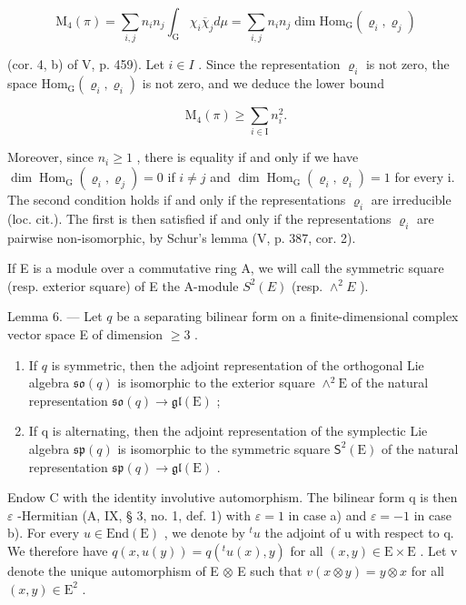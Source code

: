 \[
\mathrm{M} _ {4} (\pi) = \sum_ {i, j} n _ {i} n _ {j} \int_ {\mathrm{G}} \chi_ {i} \overline {{\chi}} _ {j} d \mu = \sum_ {i, j} n _ {i} n _ {j} \dim \mathrm{Hom} _ {\mathrm{G}} (\varrho_ {i}, \varrho_ {j})
\]

(cor. 4, b) of V, p. 459). Let \(i \in I\) . Since the representation \(\varrho_{i}\) is not zero, the space \(\mathrm{Hom}_{\mathrm{G}}(\varrho_{i}, \varrho_{i})\) is not zero, and we deduce the lower bound

\[
\mathrm{M} _ {4} (\pi) \geqslant \sum_ {i \in \mathrm{I}} n _ {i} ^ {2}.
\]

Moreover, since \(n_{i} \geqslant 1\) , there is equality if and only if we have \(\dim \operatorname{Hom}_{\mathrm{G}}(\varrho_{i}, \varrho_{j}) = 0\) if \(i \neq j\) and \(\dim \operatorname{Hom}_{\mathrm{G}}(\varrho_{i}, \varrho_{i}) = 1\) for every i. The second condition holds if and only if the representations \(\varrho_{i}\) are irreducible (loc. cit.). The first is then satisfied if and only if the representations \(\varrho_{i}\) are pairwise non-isomorphic, by Schur's lemma (V, p. 387, cor. 2).

If E is a module over a commutative ring A, we will call the symmetric square (resp. exterior square) of E the A-module \(S^{2}(E)\) (resp. \(\wedge^{2}E\) ).

Lemma 6. --- Let \(q\) be a separating bilinear form on a finite-dimensional complex vector space E of dimension \(\geqslant 3\) .

\begin{enumerate}
\def\labelenumi{\alph{enumi})}
\item
  If \(q\) is symmetric, then the adjoint representation of the orthogonal Lie algebra \(\mathfrak{so}(q)\) is isomorphic to the exterior square \(\wedge^2\mathrm{E}\) of the natural representation \(\mathfrak{so}(q) \to \mathfrak{gl}(\mathrm{E})\) ;
\item
  If q is alternating, then the adjoint representation of the symplectic Lie algebra \(\mathfrak{sp}(q)\) is isomorphic to the symmetric square \(\mathsf{S}^2 (\mathrm{E})\) of the natural representation \(\mathfrak{sp}(q)\to \mathfrak{gl}(\mathrm{E})\) .
\end{enumerate}

Endow C with the identity involutive automorphism. The bilinear form q is then \(\varepsilon\) -Hermitian (A, IX, § 3, no. 1, def. 1) with \(\varepsilon = 1\) in case a) and \(\varepsilon = -1\) in case b). For every \(u \in \text{End}(\text{E})\) , we denote by \({}^{t}u\) the adjoint of u with respect to q. We therefore have \(q(x, u(y)) = q(^{t}u(x), y)\) for all \((x, y) \in \text{E} \times \text{E}\) . Let v denote the unique automorphism of E \(\otimes\) E such that \(v(x \otimes y) = y \otimes x\) for all \((x, y) \in \text{E}^{2}\) .


